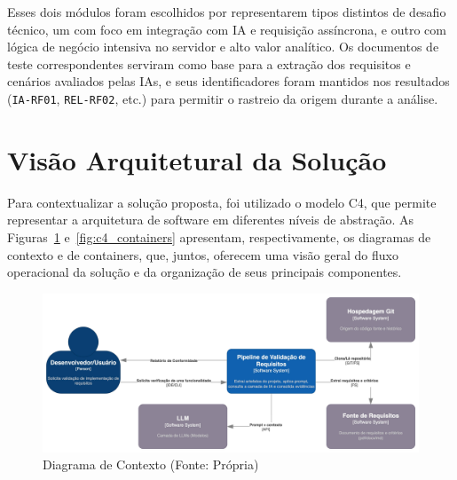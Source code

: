 Esses dois módulos foram escolhidos por representarem tipos distintos de desafio técnico, um com foco em integração com IA e requisição assíncrona, e outro com lógica de negócio intensiva no servidor e alto valor analítico. Os documentos de teste correspondentes serviram como base para a extração dos requisitos e cenários avaliados pelas IAs, e seus identificadores foram mantidos nos resultados (\texttt{IA-RF01}, \texttt{REL-RF02}, etc.) para permitir o rastreio da origem durante a análise.

\section{Visão Arquitetural da Solução}

Para contextualizar a solução proposta, foi utilizado o modelo C4, que permite representar a arquitetura de software em diferentes níveis de abstração. As Figuras~\ref{fig:c4_contexto} e~\ref{fig:c4_containers} apresentam, respectivamente, os diagramas de contexto e de containers, que, juntos, oferecem uma visão geral do fluxo operacional da solução e da organização de seus principais componentes.

\begin{figure}[H]
    \centering
    \begin{adjustbox}{width=0.9\textwidth,center}
        \includegraphics{imgs/c4_context.jpeg}
    \end{adjustbox}
    \caption{Diagrama de Contexto (Fonte: Própria)}
    \label{fig:c4_contexto}
\end{figure}


